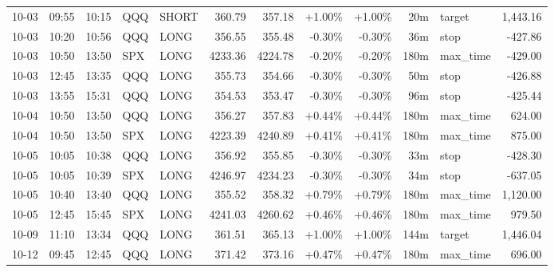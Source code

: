 \documentclass[11pt,a4paper]{article}
\begin{document}
\begin{center}
\begin{longtable}{>{\color{txtmain}}l l l l l r r r r r >{\color{txtmain}}l r}
10-03 & 09:55 & 10:15 & QQQ & SHORT & 360.79 & 357.18 & \textcolor{wingreen}{+1.00\%} & \textcolor{wingreen}{+1.00\%} & 20m & target & \textcolor{wingreen}{1,443.16} \\
10-03 & 10:20 & 10:56 & QQQ & LONG & 356.55 & 355.48 & \textcolor{lossred}{-0.30\%} & \textcolor{lossred}{-0.30\%} & 36m & stop & \textcolor{lossred}{-427.86} \\
10-03 & 10:50 & 13:50 & SPX & LONG & 4233.36 & 4224.78 & \textcolor{lossred}{-0.20\%} & \textcolor{lossred}{-0.20\%} & 180m & max\_time & \textcolor{lossred}{-429.00} \\
10-03 & 12:45 & 13:35 & QQQ & LONG & 355.73 & 354.66 & \textcolor{lossred}{-0.30\%} & \textcolor{lossred}{-0.30\%} & 50m & stop & \textcolor{lossred}{-426.88} \\
10-03 & 13:55 & 15:31 & QQQ & LONG & 354.53 & 353.47 & \textcolor{lossred}{-0.30\%} & \textcolor{lossred}{-0.30\%} & 96m & stop & \textcolor{lossred}{-425.44} \\
10-04 & 10:50 & 13:50 & QQQ & LONG & 356.27 & 357.83 & \textcolor{wingreen}{+0.44\%} & \textcolor{wingreen}{+0.44\%} & 180m & max\_time & \textcolor{wingreen}{624.00} \\
10-04 & 10:50 & 13:50 & SPX & LONG & 4223.39 & 4240.89 & \textcolor{wingreen}{+0.41\%} & \textcolor{wingreen}{+0.41\%} & 180m & max\_time & \textcolor{wingreen}{875.00} \\
10-05 & 10:05 & 10:38 & QQQ & LONG & 356.92 & 355.85 & \textcolor{lossred}{-0.30\%} & \textcolor{lossred}{-0.30\%} & 33m & stop & \textcolor{lossred}{-428.30} \\
10-05 & 10:05 & 10:39 & SPX & LONG & 4246.97 & 4234.23 & \textcolor{lossred}{-0.30\%} & \textcolor{lossred}{-0.30\%} & 34m & stop & \textcolor{lossred}{-637.05} \\
10-05 & 10:40 & 13:40 & QQQ & LONG & 355.52 & 358.32 & \textcolor{wingreen}{+0.79\%} & \textcolor{wingreen}{+0.79\%} & 180m & max\_time & \textcolor{wingreen}{1,120.00} \\
10-05 & 12:45 & 15:45 & SPX & LONG & 4241.03 & 4260.62 & \textcolor{wingreen}{+0.46\%} & \textcolor{wingreen}{+0.46\%} & 180m & max\_time & \textcolor{wingreen}{979.50} \\
10-09 & 11:10 & 13:34 & QQQ & LONG & 361.51 & 365.13 & \textcolor{wingreen}{+1.00\%} & \textcolor{wingreen}{+1.00\%} & 144m & target & \textcolor{wingreen}{1,446.04} \\
10-12 & 09:45 & 12:45 & QQQ & LONG & 371.42 & 373.16 & \textcolor{wingreen}{+0.47\%} & \textcolor{wingreen}{+0.47\%} & 180m & max\_time & \textcolor{wingreen}{696.00} \\

\end{longtable}
\end{center}
\end{document}
